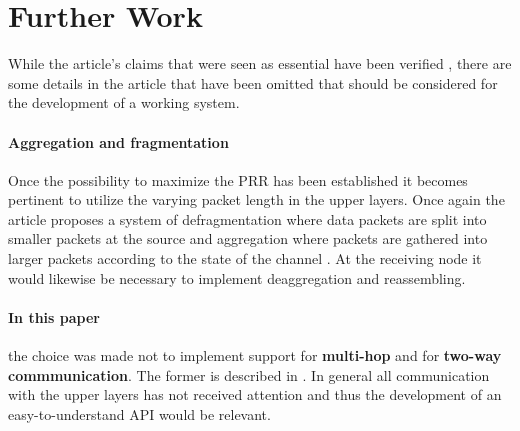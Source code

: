 \section{Further Work}
While the article's claims that were seen as essential have been verified \cite{DPLCpaper}, there are some details in the article that have been omitted that should be considered for the development of a working system.
\paragraph{Aggregation and fragmentation} Once the possibility to maximize the PRR has been established it becomes pertinent to utilize the varying packet length in the upper layers. Once again the article proposes a system of defragmentation where data packets are split into smaller packets at the source and aggregation where packets are gathered into larger packets according to the state of the channel \cite{DPLCpaper}. At the receiving node it would likewise be necessary to implement deaggregation and reassembling.
\paragraph {In this paper} the choice was made not to implement support for \textbf{multi-hop} and for \textbf{two-way commmunication}. The former is described in \cite{DPLCpaper}. In general all communication with the upper layers has not received attention and thus the development of an easy-to-understand API would be relevant.